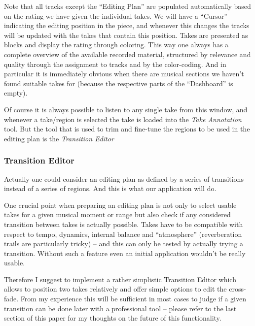 \documentclass[11pt,a4paper]{article}
\begin{document}
Note that all tracks except the “Editing Plan” are populated automatically based on the rating we have given the individual takes.
We will have a “Cursor” indicating the editing position in the piece, and whenever this changes the tracks will be updated with the takes that contain this position.
Takes are presented as blocks and display the rating through coloring.
This way one always has a complete overview of the available recorded material, structured by relevance and quality through the assignment to tracks and by the color-coding.
And in particular it is immediately obvious when there are musical sections we haven't found suitable takes for (because the respective parts of the “Dashboard” is empty).

Of course it is always possible to listen to any single take from this window, and whenever a take/region is selected the take is loaded into the \emph{Take Annotation} tool.
But the tool that is used to trim and fine-tune the regions to be used in the editing plan is the \emph{Transition Editor}

\subsubsection{Transition Editor}


Actually one could consider an editing plan as defined by a series of transitions instead of a series of regions.
And this is what our application will do.

One crucial point when preparing an editing plan is not only to select usable takes for a given musical moment or range but also check if any considered transition between takes is actually possible.
Takes have to be compatible with respect to tempo, dynamics, internal balance and “atmosphere” (reverberation trails are particularly tricky) -- and this can only be tested by actually trying a transition.
Without such a feature even an initial application wouldn't be really usable.

Therefore I suggest to implement a rather simplistic Transition Editor which allows to position two takes relatively and offer simple options to edit the cross-fade.
From my experience this will be sufficient in most cases to judge if a given transition can be done later with a professional tool -- please refer to the last section of this paper for my thoughts on the future of this functionality.
\end{document}
